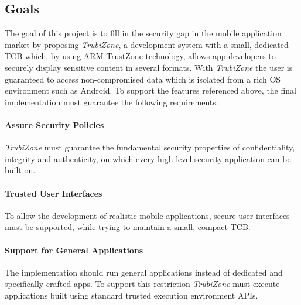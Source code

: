\subsection{Goals}



The goal of this project is to fill in the security gap in the mobile application market by proposing \emph{TrubiZone}, a development system with a small, dedicated \ac{TCB} which, by using ARM TrustZone technology, allows app developers to securely display sensitive content in several formats. With \emph{TrubiZone} the user is guaranteed  to access non-compromised data which is isolated from a rich OS environment such as Android.
%
To support the features referenced above, the final implementation must guarantee the following requirements:
%
\paragraph*{\textbf{Assure Security Policies\\}} \emph{TrubiZone} must guarantee the fundamental security properties of confidentiality, integrity and authenticity, on which every high level security application can be built on.

\paragraph*{\textbf{Trusted User Interfaces\\}} To allow the development of realistic mobile applications, secure user interfaces must be supported, while trying to maintain a small, compact \ac{TCB}.

\paragraph*{\textbf{Support for General Applications\\}} The implementation should run general applications instead of dedicated and specifically crafted apps. To support this restriction \emph{TrubiZone} must execute applications built using standard trusted execution environment APIs.

